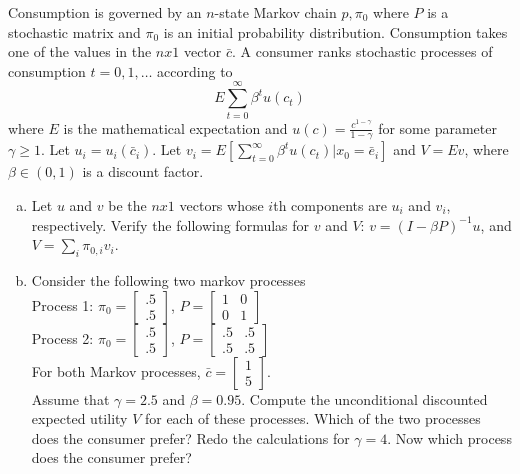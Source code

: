 \documentclass{homework}
\begin{document}
\begin{homeworkProblem}[Problem 2.3]

  Consumption is governed by an $n$-state Markov chain $p, \pi_0$ where $P$ is a stochastic matrix and $\pi_0$ is an initial probability distribution. Consumption takes one of the values in the $n x 1$ vector $\bar{c}$. A consumer ranks stochastic processes of consumption $t = 0, 1, \dots $ according to $$ E \sum_{t=0}^{\infty} \beta^t u (c_t)$$ where $E$ is the mathematical expectation and $u(c) = \frac{c^{1 - \gamma}}{1 -\gamma}$ for some parameter $\gamma \ge 1$. Let $u_i = u_i(\bar{c}_i)$. Let $v_i = E \left[\sum_{t=0}^{\infty} \beta^t u(c_t) | x_0 = \bar{e}_i \right]$ and $V = Ev$, where $\beta \in (0, 1)$ is a discount factor.

  \begin{enumerate}[a.]
    \item Let $u$ and $v$ be the $n x 1$ vectors whose $i$th components are $u_i$ and $v_i$, respectively. Verify the following formulas for $v$ and $V$: $v = (I - \beta P)^{-1}u$, and $V = \sum_i \pi_{0, i}v_i$.

    \item Consider the following two markov processes \\
      Process 1: $\pi_0 = \left[\begin{smallmatrix} .5 \\ .5 \end{smallmatrix}\right]$, $P = \left[\begin{smallmatrix} 1 & 0 \\ 0 & 1 \end{smallmatrix}\right]$ \\
      Process 2: $\pi_0 = \left[\begin{smallmatrix} .5 \\ .5 \end{smallmatrix}\right]$, $P = \left[\begin{smallmatrix} .5 & .5 \\ .5 & .5 \end{smallmatrix}\right]$ \\
      For both Markov processes, $\bar{c} = \left[\begin{smallmatrix} 1 \\ 5 \end{smallmatrix}\right]$. \\
      Assume that $\gamma = 2.5$ and $\beta = 0.95$. Compute the unconditional discounted expected utility $V$ for each of these processes. Which of the two processes does the consumer prefer? Redo the calculations for $\gamma = 4$. Now which process does the consumer prefer?


\end{enumerate}
\end{homeworkProblem}
\end{document}
